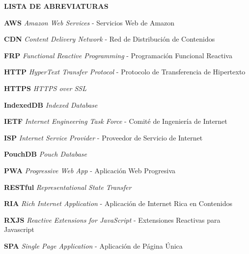 
\begin{center}
\textsc{\bfseries\uppercase{Lista de Abreviaturas}}
\end{center}

{
\setlength{\parskip}{1em}

\textbf{AWS} \textit{Amazon Web Services} - Servicios Web de Amazon

\textbf{CDN} \textit{Content Delivery Network} - Red de Distribución de Contenidos

\textbf{FRP} \textit{Functional Reactive Programming} - Programación Funcional Reactiva

\textbf{HTTP} \textit{HyperText Transfer Protocol} - Protocolo de Transferencia de Hipertexto

\textbf{HTTPS} \textit{HTTPS over SSL}

\textbf{IndexedDB} \textit{Indexed Database}

\textbf{IETF} \textit{Internet Engineering Task Force} - Comité de Ingeniería de Internet

\textbf{ISP} \textit{Internet Service Provider} - Proveedor de Servicio de Internet

\textbf{PouchDB} \textit{Pouch Database}

\textbf{PWA} \textit{Progressive Web App} - Aplicación Web Progresiva

\textbf{RESTful} \textit{Representational State Transfer}

\textbf{RIA} \textit{Rich Internet Application} - Aplicación de Internet Rica en Contenidos

\textbf{RXJS} \textit{Reactive Extensions for JavaScript} - Extensiones Reactivas para Javascript

\textbf{SPA} \textit{Single Page Application} - Aplicación de Página Única
}

\newpage
